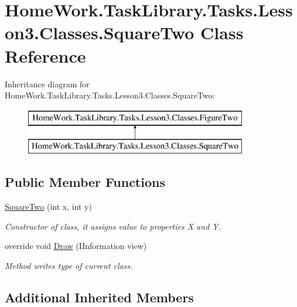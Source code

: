 \hypertarget{class_home_work_1_1_task_library_1_1_tasks_1_1_lesson3_1_1_classes_1_1_square_two}{}\section{Home\+Work.\+Task\+Library.\+Tasks.\+Lesson3.\+Classes.\+Square\+Two Class Reference}
\label{class_home_work_1_1_task_library_1_1_tasks_1_1_lesson3_1_1_classes_1_1_square_two}
Inheritance diagram for Home\+Work.\+Task\+Library.\+Tasks.\+Lesson3.\+Classes.\+Square\+Two\+:\begin{figure}[H]
\begin{center}
\leavevmode
\includegraphics[height=2.000000cm]{class_home_work_1_1_task_library_1_1_tasks_1_1_lesson3_1_1_classes_1_1_square_two}
\end{center}
\end{figure}
\subsection*{Public Member Functions}
\begin{DoxyCompactItemize}
\item 
\mbox{\hyperlink{class_home_work_1_1_task_library_1_1_tasks_1_1_lesson3_1_1_classes_1_1_square_two_a96f064b732439ec247f5df58cdcbe566}{Square\+Two}} (int x, int y)
\begin{DoxyCompactList}\small\item\em Constructor of class, it assigns value to properties X and Y. \end{DoxyCompactList}\item 
override void \mbox{\hyperlink{class_home_work_1_1_task_library_1_1_tasks_1_1_lesson3_1_1_classes_1_1_square_two_a7ec443c0729d0e88476f703b7562b0e2}{Draw}} (I\+Information view)
\begin{DoxyCompactList}\small\item\em Method writes type of current class. \end{DoxyCompactList}\end{DoxyCompactItemize}
\subsection*{Additional Inherited Members}


